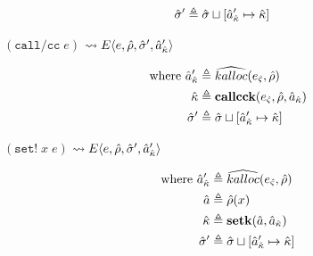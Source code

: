 \documentclass[12pt,draft]{article}
\newcommand{\callccsyn}[1]{(\texttt{call/cc}\;#1)}
\newcommand{\setsyn}[2]{(\texttt{set!}\;#1\;#2)}
\begin{document}
{\begin{multicols*}{2}
\begin{align*}
  \hat{\sigma}' &\triangleq \hat{\sigma} \sqcup [\hat{a}_{\hat{\kappa}}' \mapsto \hat{\kappa}]
\end{align*}
\begin{center}
  $\callccsyn{e}$
  $\leadsto E\langle e , \hat{\rho} , \hat{\sigma}' , \hat{a}_{\hat{\kappa}}' \rangle$
\end{center}
\vspace{-7mm}
\begin{align*}
  \text{where }
  \hat{a}_{\hat{\kappa}}' &\triangleq \widehat{kalloc}(e_{\hat{\varsigma}} , \hat{\rho}) \\
  \hat{\kappa} &\triangleq \textbf{callcck}(e_{\hat{\varsigma}} , \hat{\rho} , \hat{a}_{\hat{\kappa}}) \\
  \hat{\sigma}' &\triangleq \hat{\sigma} \sqcup [\hat{a}_{\hat{\kappa}}' \mapsto \hat{\kappa}]
\end{align*}
\begin{center}
  $\setsyn{x}{e}$
  $\leadsto E\langle e , \hat{\rho} , \hat{\sigma}' , \hat{a}_{\hat{\kappa}}' \rangle$
\end{center}
\vspace{-7mm}
\begin{align*}
  \text{where }
  \hat{a}_{\hat{\kappa}}' &\triangleq \widehat{kalloc}(e_{\hat{\varsigma}} , \hat{\rho}) \\
  \hat{a} &\triangleq \hat{\rho}(x) \\
  \hat{\kappa} &\triangleq \textbf{setk}(\hat{a} , \hat{a}_{\hat{\kappa}}) \\
  \hat{\sigma}' &\triangleq \hat{\sigma} \sqcup [\hat{a}_{\hat{\kappa}}' \mapsto \hat{\kappa}]
\end{align*}


\vfill\null
\columnbreak


\end{multicols*}}
\end{document}
